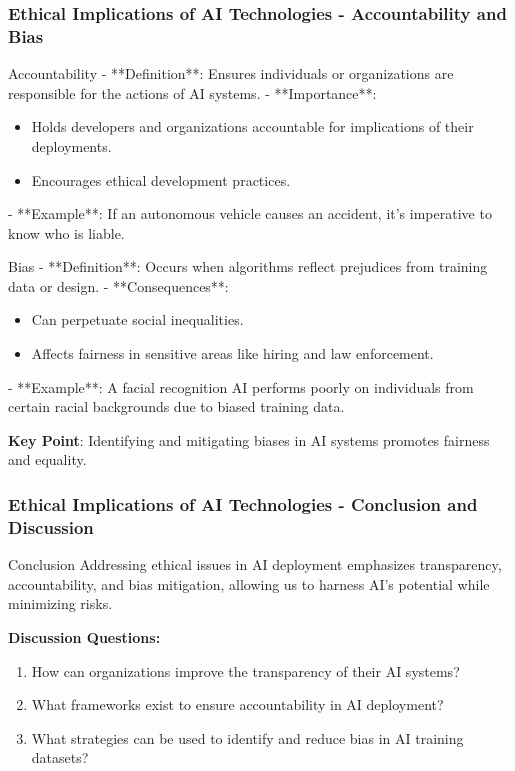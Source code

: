 \documentclass[aspectratio=169]{beamer}
\begin{document}
\begin{frame}[fragile]
    \frametitle{Ethical Implications of AI Technologies - Accountability and Bias}
    \begin{block}{Accountability}
        - **Definition**: Ensures individuals or organizations are responsible for the actions of AI systems.
        - **Importance**:
        \begin{itemize}
            \item Holds developers and organizations accountable for implications of their deployments.
            \item Encourages ethical development practices.
        \end{itemize}
        - **Example**: If an autonomous vehicle causes an accident, it's imperative to know who is liable.
    \end{block}

    \begin{block}{Bias}
        - **Definition**: Occurs when algorithms reflect prejudices from training data or design.
        - **Consequences**:
        \begin{itemize}
            \item Can perpetuate social inequalities.
            \item Affects fairness in sensitive areas like hiring and law enforcement.
        \end{itemize}
        - **Example**: A facial recognition AI performs poorly on individuals from certain racial backgrounds due to biased training data.
    \end{block}
    \textbf{Key Point}: Identifying and mitigating biases in AI systems promotes fairness and equality.
\end{frame}

\begin{frame}[fragile]
    \frametitle{Ethical Implications of AI Technologies - Conclusion and Discussion}
    \begin{block}{Conclusion}
        Addressing ethical issues in AI deployment emphasizes transparency, accountability, and bias mitigation, allowing us to harness AI's potential while minimizing risks.
    \end{block}

    \textbf{Discussion Questions:}
    \begin{enumerate}
        \item How can organizations improve the transparency of their AI systems?
        \item What frameworks exist to ensure accountability in AI deployment?
        \item What strategies can be used to identify and reduce bias in AI training datasets?
    \end{enumerate}
\end{frame}
\end{document}
